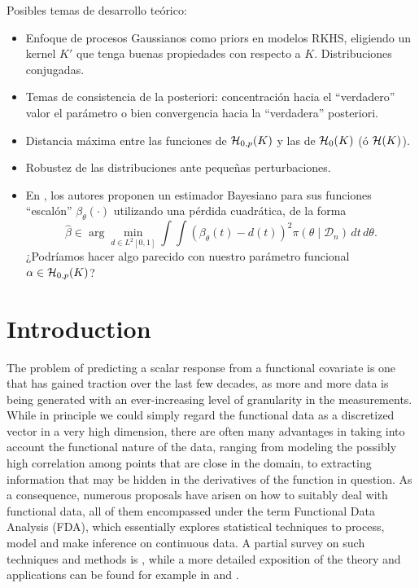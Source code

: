 \documentclass[ba]{imsart}
\numberwithin{equation}{section}
\theoremstyle{plain}
\newcommand{\Hcal}{\ensuremath\mathcal{H}}
\newenvironment{comment}[1][comment-red]
{
\noindent \color{#1}
}
{
\color{black}
}
\begin{document}
\begin{comment}
Posibles temas de desarrollo teórico:
  \begin{itemize}
    \item Enfoque de procesos Gaussianos como priors en modelos RKHS, eligiendo un kernel \(K'\) que tenga buenas propiedades con respecto a \(K\). Distribuciones conjugadas.
    \item Temas de consistencia de la posteriori: concentración hacia el ``verdadero'' valor el parámetro o bien convergencia hacia la ``verdadera'' posteriori.
    \item Distancia máxima entre las funciones de \(\Hcal_{0,p}(K)\) y las de \(\Hcal_0(K)\) (ó \(\Hcal(K)\)).
    \item Robustez de las distribuciones ante pequeñas perturbaciones.
    \item  En \citet[Sec.~2.5]{grollemund2019bayesian}, los autores proponen un estimador Bayesiano para sus funciones ``escalón'' \(\beta_\theta(\cdot)\) utilizando una pérdida cuadrática, de la forma
  \[
    \hat \beta \in \arg\min_{d\in L^2[0, 1]} \int\int (\beta_\theta(t) - d(t))^2 \pi(\theta\mid \mathcal D_n)\, dt\, d\theta.
  \]
  ¿Podríamos hacer algo parecido con nuestro parámetro funcional \(\alpha \in \Hcal_{0,p}(K)\)?
  \end{itemize}
\end{comment}

\section{Introduction}\label{sec:intro}

The problem of predicting a scalar response from a functional covariate is one that has gained traction over the last few decades, as more and more data is being generated with an ever-increasing level of granularity in the measurements. While in principle we could simply regard the functional data as a discretized vector in a very high dimension, there are often many advantages in taking into account the functional nature of the data, ranging from modeling the possibly high correlation among points that are close in the domain, to extracting information that may be hidden in the derivatives of the function in question. As a consequence, numerous proposals have arisen on how to suitably deal with functional data, all of them encompassed under the term Functional Data Analysis (FDA), which essentially explores statistical techniques to process, model and make inference on continuous data. A partial survey on such techniques and methods is \citet{cuevas2014partial}, while a more detailed exposition of the theory and applications can be found for example in \citet{hsing2015theoretical} and \citet{horváth2012inference}.
\end{document}
